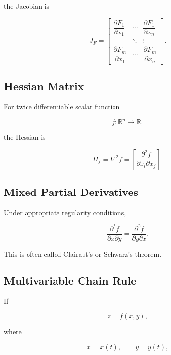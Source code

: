 the Jacobian is

\[
\boxed{
J_F
=
\begin{bmatrix}
\dfrac{\partial F_1}{\partial x_1}
&
\cdots
&
\dfrac{\partial F_1}{\partial x_n}
\\
\vdots
&
\ddots
&
\vdots
\\
\dfrac{\partial F_m}{\partial x_1}
&
\cdots
&
\dfrac{\partial F_m}{\partial x_n}
\end{bmatrix}.
}
\]

\subsection{Hessian Matrix}
\label{subsec:hessian-derivative-reference}

For twice differentiable scalar function

\[
f:\mathbb{R}^n\to\mathbb{R},
\]

the Hessian is

\[
\boxed{
H_f
=
\nabla^2f
=
\left[
\frac{
\partial^2f
}{
\partial x_i\partial x_j
}
\right].
}
\]

\subsection{Mixed Partial Derivatives}
\label{subsec:mixed-partial-reference}

Under appropriate regularity conditions,

\[
\boxed{
\frac{
\partial^2f
}{
\partial x\partial y
}
=
\frac{
\partial^2f
}{
\partial y\partial x
}.
}
\]

This is often called Clairaut's or Schwarz's theorem.

\subsection{Multivariable Chain Rule}
\label{subsec:multivariable-chain-rule-reference}

If

\[
z=f(x,y),
\]

where

\[
x=x(t),
\qquad
y=y(t),
\]

